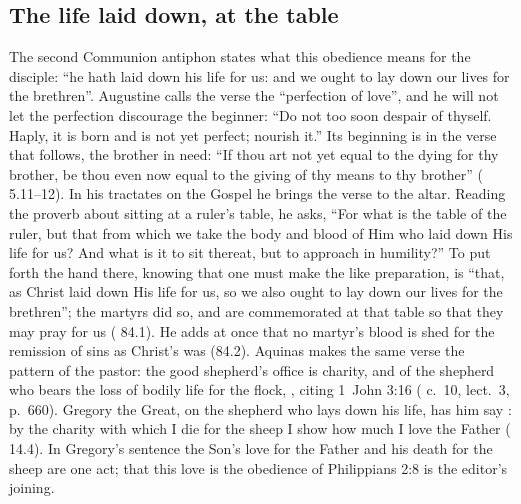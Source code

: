 \subsection{The life laid down, at the table}

The second Communion antiphon states what this obedience means for the
disciple: ``he hath laid down his life for us: and we ought to lay down our
lives for the brethren''. Augustine calls the verse the ``perfection of
love'', and he will not let the perfection discourage the beginner: ``Do not
too soon despair of thyself. Haply, it is born and is not yet perfect; nourish
it.'' Its beginning is in the verse that follows, the brother in need: ``If thou
art not yet equal to the dying for thy brother, be thou even now equal to the
giving of thy means to thy brother'' ( 5.11--12). In his tractates on the Gospel he brings the verse to the
altar. Reading the proverb about sitting at a ruler's table, he asks, ``For what
is the table of the ruler, but that from which we take the body and blood of
Him who laid down His life for us? And what is it to sit thereat, but to
approach in humility?'' To put forth the hand there, knowing that one must
make the like preparation, is ``that, as Christ laid down His life for us, so
we also ought to lay down our lives for the brethren''; the martyrs did so, and
are commemorated at that table so that they may pray for us ( 84.1). He adds at once that no martyr's blood is shed for the remission of
sins as Christ's was (84.2). Aquinas makes the same verse the pattern of the
pastor: the good shepherd's office is charity, and of the shepherd who bears the
loss of bodily life for the flock, , citing 1~John 3:16 ( c.~10, lect.~3,
p.~660). Gregory the Great, on the shepherd who lays down his life, has him say
: by
the charity with which I die for the sheep I show how much I love the Father
( 14.4). In Gregory's sentence the Son's love for
the Father and his death for the sheep are one act; that this love is the
obedience of Philippians 2:8 is the editor's joining.

